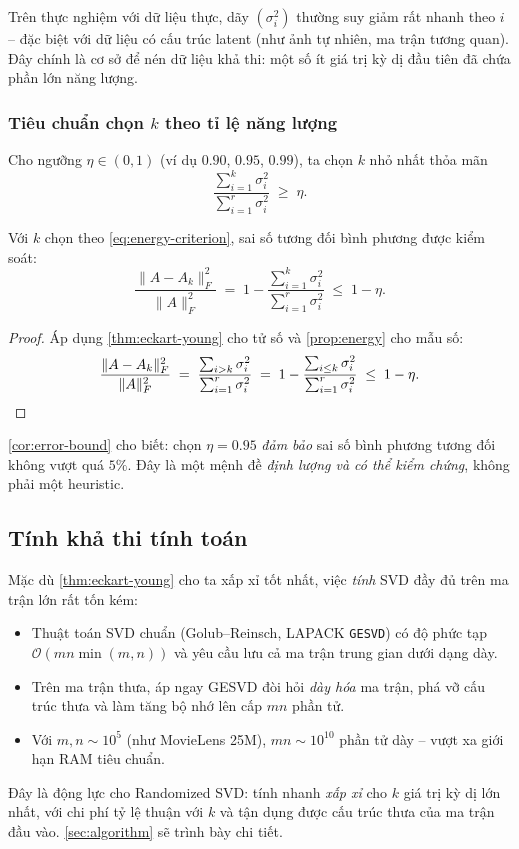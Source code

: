 Trên thực nghiệm với dữ liệu thực, dãy $(\sigma_i^2)$ thường suy giảm rất
nhanh theo $i$ -- đặc biệt với dữ liệu có cấu trúc latent (như ảnh tự nhiên,
ma trận tương quan). Đây chính là cơ sở để nén dữ liệu khả thi: một số ít
giá trị kỳ dị đầu tiên đã chứa phần lớn năng lượng.

\subsubsection*{Tiêu chuẩn chọn $k$ theo tỉ lệ năng lượng}

Cho ngưỡng $\eta \in (0, 1)$ (ví dụ $0.90$, $0.95$, $0.99$), ta chọn $k$ nhỏ
nhất thỏa mãn
\begin{equation}\label{eq:energy-criterion}
    \frac{\sum_{i=1}^{k}\sigma_i^2}{\sum_{i=1}^{r}\sigma_i^2} \;\ge\; \eta.
\end{equation}

\begin{corollary}\label{cor:error-bound}
Với $k$ chọn theo \eqref{eq:energy-criterion}, sai số tương đối bình phương
được kiểm soát:
\[
    \frac{\|A - A_k\|_F^2}{\|A\|_F^2}
       \;=\; 1 - \frac{\sum_{i=1}^{k}\sigma_i^2}{\sum_{i=1}^{r}\sigma_i^2}
       \;\le\; 1 - \eta.
\]
\end{corollary}

\begin{proof}
Áp dụng \cref{thm:eckart-young} cho tử số và \cref{prop:energy} cho mẫu số:
\[
    \frac{\|A - A_k\|_F^2}{\|A\|_F^2}
       \;=\; \frac{\sum_{i>k}\sigma_i^2}{\sum_{i=1}^{r}\sigma_i^2}
       \;=\; 1 - \frac{\sum_{i \le k}\sigma_i^2}{\sum_{i=1}^{r}\sigma_i^2}
       \;\le\; 1 - \eta. \qedhere
\]
\end{proof}

\cref{cor:error-bound} cho biết: chọn $\eta = 0.95$ \emph{đảm bảo} sai số bình
phương tương đối không vượt quá $5\%$. Đây là một mệnh đề \emph{định lượng và
có thể kiểm chứng}, không phải một heuristic.

\subsection{Tính khả thi tính toán}\label{subsec:complexity-svd}

Mặc dù \cref{thm:eckart-young} cho ta xấp xỉ tốt nhất, việc \emph{tính} SVD
đầy đủ trên ma trận lớn rất tốn kém:

\begin{itemize}
    \item Thuật toán SVD chuẩn (Golub--Reinsch, LAPACK \texttt{GESVD}) có độ
    phức tạp $\mathcal{O}(mn\min(m,n))$ và yêu cầu lưu cả ma trận trung gian
    dưới dạng dày.
    \item Trên ma trận thưa, áp ngay GESVD đòi hỏi \emph{dày hóa} ma trận,
    phá vỡ cấu trúc thưa và làm tăng bộ nhớ lên cấp $mn$ phần tử.
    \item Với $m, n \sim 10^5$ (như MovieLens 25M), $mn \sim 10^{10}$ phần
    tử dày -- vượt xa giới hạn RAM tiêu chuẩn.
\end{itemize}

Đây là động lực cho Randomized SVD: tính nhanh \emph{xấp xỉ} cho $k$ giá trị
kỳ dị lớn nhất, với chi phí tỷ lệ thuận với $k$ và tận dụng được cấu trúc thưa
của ma trận đầu vào. \cref{sec:algorithm} sẽ trình bày chi tiết.
